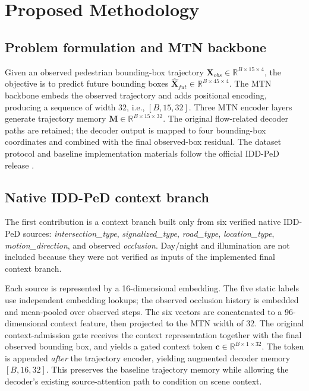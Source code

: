 \section{Proposed Methodology}
\label{sec:method}

\subsection{Problem formulation and MTN backbone}
Given an observed pedestrian bounding-box trajectory $\mathbf{X}_{obs}\in\mathbb{R}^{B\times15\times4}$, the objective is to predict future bounding boxes $\widehat{\mathbf{X}}_{fut}\in\mathbb{R}^{B\times45\times4}$. The MTN backbone embeds the observed trajectory and adds positional encoding, producing a sequence of width $32$, i.e., $[B,15,32]$. Three MTN encoder layers generate trajectory memory $\mathbf{M}\in\mathbb{R}^{B\times15\times32}$. The original flow-related decoder paths are retained; the decoder output is mapped to four bounding-box coordinates and combined with the final observed-box residual. The dataset protocol and baseline implementation materials follow the official IDD-PeD release \cite{iddped2025,iddped_repo}.

\subsection{Native IDD-PeD context branch}
\label{sec:context}
The first contribution is a context branch built only from six verified native IDD-PeD sources: \emph{intersection\_type}, \emph{signalized\_type}, \emph{road\_type}, \emph{location\_type}, \emph{motion\_direction}, and observed \emph{occlusion}. Day/night and illumination are not included because they were not verified as inputs of the implemented final context branch.

Each source is represented by a 16-dimensional embedding. The five static labels use independent embedding lookups; the observed occlusion history is embedded and mean-pooled over observed steps. The six vectors are concatenated to a 96-dimensional context feature, then projected to the MTN width of 32. The original context-admission gate receives the context representation together with the final observed bounding box, and yields a gated context token $\mathbf{c}\in\mathbb{R}^{B\times1\times32}$. The token is appended \emph{after} the trajectory encoder, yielding augmented decoder memory $[B,16,32]$. This preserves the baseline trajectory memory while allowing the decoder's existing source-attention path to condition on scene context.

